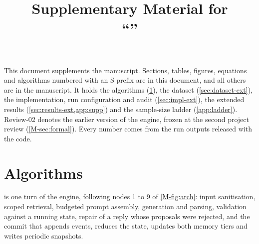 \documentclass[letterpaper,journal,onecolumn]{IEEEtran}
\begin{document}
\title{Supplementary Material for\\``\PaperTitle''}
\PaperAuthors

\maketitle

\noindent This document supplements the manuscript. Sections, tables, figures, equations and algorithms numbered with an S prefix are in this document, and all others are in the manuscript. It holds the algorithms (\cref{sec:algorithms-ext}), the dataset (\cref{sec:dataset-ext}), the implementation, run configuration and audit (\cref{sec:impl-ext}), the extended results (\cref{sec:results-ext,app:supp}) and the sample-size ladder (\cref{app:ladder}). Review-02 denotes the earlier version of the engine, frozen at the second project review (\cref{M-sec:formal}). Every number comes from the run outputs released with the code.

\section{Algorithms}\label{sec:algorithms-ext}

 is one turn of the engine, following nodes 1 to 9 of \cref{M-fig:arch}: input sanitisation, scoped retrieval, budgeted prompt assembly, generation and parsing, validation against a running state, repair of a reply whose proposals were rejected, and the commit that appends events, reduces the state, updates both memory tiers and writes periodic snapshots.
\end{document}
